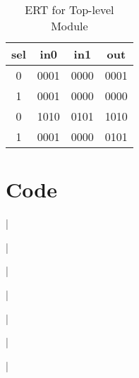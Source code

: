 \documentclass[11pt]{article}
\newcommand{\Verilog}[2][]{%
	
}
\begin{document}
\begin{table}[ht]\centering
	\caption{ERT for Top-level Module}
	\label{tbl:example_table}
	\begin{tabular}{ccc|c}
		\toprule
		sel & in0 & in1 & out \\
		\midrule
		0 & 0001 & 0000 & 0001 \\
		1 & 0001 & 0000 & 0000 \\
		0 & 1010 & 0101 & 1010 \\
		1 & 0001 & 0000 & 0101 \\
		\bottomrule
	\end{tabular} 
\end{table}

\section*{Code}

\Verilog[firstline=22, lastline=31, caption=MUX Verilog code]{Lab06_project/codedirectory/mux2_4b.sv}|

\Verilog[firstline=22, lastline=45, caption=MUX Test Verilog code]{Lab06_project/codedirectory/mux2_4b_test.sv}|

\Verilog[firstline=22, lastline=51, caption=Seven-segment Decoder Verilog code]{Lab06_project/codedirectory/sseg_decoder.sv}|

\Verilog[firstline=22, lastline=42, caption=Seven-segment Decoder Test Verilog code]{Lab06_project/codedirectory/sseg_decoder_test.sv}|

\Verilog[firstline=22, lastline=43, caption=Seven-segment Wrapper Verilog code]{Lab06_project/codedirectory/sseg1_wrapper.sv}|

\Verilog[firstline=22, lastline=53, caption=Seven-segment 1 Verilog code]{Lab06_project/codedirectory/sseg1.sv}|

\Verilog[firstline=22, lastline=57, caption=Seven-segment 1 Test Verilog code]{Lab06_project/codedirectory/sseg1_test.sv}|
\end{document}

